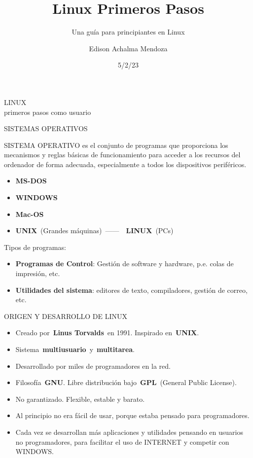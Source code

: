 \documentclass[
  letterpaper,
]{article}
\title{Linux Primeros Pasos}
\subtitle{Una guía para principiantes en Linux}
\author{Edison Achalma Mendoza}
\date{5/2/23}
\providecommand{\tightlist}{%
  \setlength{\itemsep}{0pt}\setlength{\parskip}{0pt}}\usepackage{longtable,booktabs,array}
\renewcommand*\contentsname{Table of contents}
\newcommand\contentsname{Table of contents}
\begin{document}
\maketitle
\ifdefined\Shaded\renewenvironment{Shaded}{\begin{tcolorbox}[sharp corners, interior hidden, borderline west={3pt}{0pt}{shadecolor}, enhanced, breakable, frame hidden, boxrule=0pt]}{\end{tcolorbox}}\fi

\renewcommand*\contentsname{Contenidos}
{
\hypersetup{linkcolor=}
\setcounter{tocdepth}{2}
\tableofcontents
}
LINUX\\
primeros pasos como usuario

SISTEMAS OPERATIVOS

SISTEMA OPERATIVO es el conjunto de programas que proporciona los
mecanismos y reglas básicas de funcionamiento para acceder a los
recursos del ordenador de forma adecuada, especialmente a todos los
dispositivos periféricos.

\begin{itemize}
\tightlist
\item
  \textbf{MS-DOS}
\item
  \textbf{WINDOWS}
\item
  \textbf{Mac-OS}
\item
  \textbf{UNIX}~(Grandes máquinas)~------~~\textbf{LINUX}~(PCs)
\end{itemize}

Tipos de programas:

\begin{itemize}
\tightlist
\item
  \textbf{Programas de Control}: Gestión de software y hardware, p.e.
  colas de impresión, etc.
\item
  \textbf{Utilidades del sistema}: editores de texto, compiladores,
  gestión de correo, etc.
\end{itemize}

ORIGEN Y DESARROLLO DE LINUX

\begin{itemize}
\tightlist
\item
  Creado por~\textbf{Linus Torvalds}~en 1991. Inspirado
  en~\textbf{UNIX}.
\item
  Sistema~\textbf{multiusuario}~y~\textbf{multitarea}.
\item
  Desarrollado por miles de programadores en la red.
\item
  Filosofía~\textbf{GNU}. Libre distribución bajo~\textbf{GPL}~(General
  Public License).
\item
  No garantizado. Flexible, estable y barato.
\item
  Al principio no era fácil de usar, porque estaba pensado para
  programadores.
\item
  Cada vez se desarrollan más aplicaciones y utilidades pensando en
  usuarios no programadores, para facilitar el uso de INTERNET y
  competir con WINDOWS.
\end{itemize}
\end{document}
